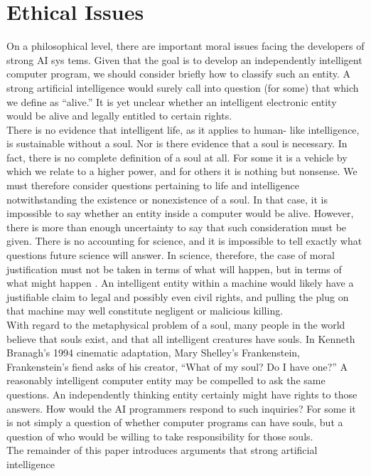 \section{Ethical Issues}
On a philosophical level, there are important moral issues facing the developers of
strong AI sys tems. Given that the goal is to develop an independently intelligent
computer program, we should consider briefly how to classify such an entity. A strong
artificial intelligence would surely call into question (for some) that which we define as
“alive.” It is yet unclear whether an intelligent electronic entity would be alive and
legally entitled to certain rights.\\
There is no evidence that intelligent life, as it applies to human- like intelligence,
is sustainable without a soul. Nor is there evidence that a soul is necessary. In fact, there
is no complete definition of a soul at all. For some it is a vehicle by which we relate to a
higher power, and for others it is nothing but nonsense. We must therefore consider questions pertaining to life and intelligence notwithstanding the existence or nonexistence
of a soul. In that case, it is impossible to say whether an entity inside a computer would
be alive. However, there is more than enough uncertainty to say that such consideration
must be given. There is no accounting for science, and it is impossible to tell exactly
what questions future science will answer. In science, therefore, the case of moral
justification must not be taken in terms of what will happen, but in terms of what might
happen \cite{seven}. An intelligent entity within a machine would likely have a justifiable
claim to legal and possibly even civil rights, and pulling the plug on that machine may
well constitute negligent or malicious killing.\\
With regard to the metaphysical problem of a soul, many people in the world
believe that souls exist, and that all intelligent creatures have souls. In Kenneth
Branagh’s 1994 cinematic adaptation, Mary Shelley’s Frankenstein, Frankenstein’s fiend
asks of his creator, “What of my soul? Do I have one?” A reasonably intelligent
computer entity may be compelled to ask the same questions. An independently thinking
entity certainly might have rights to those answers. How would the AI programmers
respond to such inquiries? For some it is not simply a question of whether computer
programs can have souls, but a question of who would be willing to take responsibility
for those souls.\\
The remainder of this paper introduces arguments that strong artificial intelligence
